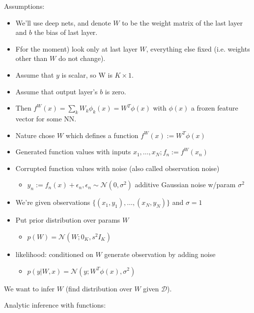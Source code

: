 \documentclass{article}
\begin{document}
Assumptions:

\begin{itemize}
    \item We'll use deep nets, and denote $W$ to be the weight matrix of the last layer and $b$ the bias of last layer.
    \item Ffor the moment) look only at last layer $W$, everything else fixed (i.e. weights other than $W$ do not change).
    \item Assume that $y$ is scalar, so W is $K \times 1$.
    \item Assume that output layer's $b$ is zero.
    \item Then $f^W(x) = \sum_k W_k \phi_k(x) = W^T \phi(x)$ with $\phi(x)$ a frozen feature vector for some NN.
    \item Nature chose $W$ which defines a function $f^W(x) := W^T\phi(x)$
    \item Generated function values with inputs $x_1,\dots,x_N; f_n := f^W(x_n)$
    \item Corrupted function values with noise (also called observation noise)
    \begin{itemize}
        \item $y_n := f_n(x) + \epsilon_n, \epsilon_n \sim \mathcal{N}(0,\sigma^2)$ additive Gaussian noise w/param $\sigma^2$
    \end{itemize}
    \item We're given observations $\{(x_1,y_1),\dots,(x_N,y_N)\}$ and $\sigma=1$
    \item Put prior distribution over params $W$
    \begin{itemize}
        \item $p(W) = \mathcal{N}(W;0_K,s^2I_K)$
    \end{itemize}
    \item likelihood: conditioned on $W$ generate observation by adding noise
    \begin{itemize}
        \item $p(y|W,x) = \mathcal{N}(y;W^T\phi(x), \sigma^2)$
    \end{itemize}
\end{itemize}

We want to infer $W$ (find distribution over $W$ given $\mathcal{D}$).

Analytic inference with functions:
\end{document}
